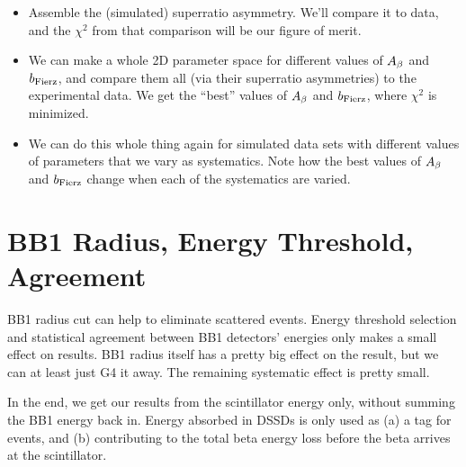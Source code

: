 \begin{itemize}
	\item Assemble the (simulated) superratio asymmetry.  We'll compare it to data, and the $\chi^2$ from that comparison will be our figure of merit.  
	\item We can make a whole 2D parameter space for different values of $A_{\beta}$ and $b_{\mathrm{Fierz}}$, and compare them all (via their superratio asymmetries) to the experimental data.  We get the ``best'' values of $A_{\beta}$ and $b_{\mathrm{Fierz}}$, where $\chi^2$ is minimized.
	\item We can do this whole thing again for simulated data sets with different values of parameters that we vary as systematics.  Note how the best values of $A_{\beta}$ and $b_{\mathrm{Fierz}}$ change when each of the systematics are varied.
\end{itemize}



\FloatBarrier
\section{BB1 Radius, Energy Threshold, Agreement}
\label{section:bb1_systematics}
BB1 radius cut can help to eliminate scattered events.  Energy threshold selection and statistical agreement between BB1 detectors' energies only makes a small effect on results.  BB1 radius itself has a pretty big effect on the result, but we can at least just G4 it away.  The remaining systematic effect is pretty small.  
	

In the end, we get our results from the scintillator energy only, without summing the BB1 energy back in.  Energy absorbed in DSSDs is only used as (a) a tag for events, and (b) contributing to the total beta energy loss before the beta arrives at the scintillator.




